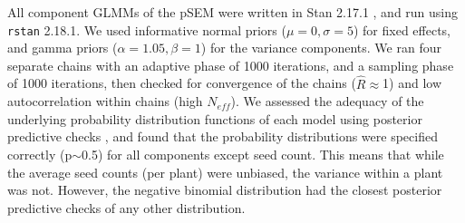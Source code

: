 \documentclass[12pt]{article} %
\begin{document}

All component GLMMs of the pSEM were written in Stan 2.17.1 \citep{gelman2015}, and run using \texttt{rstan} 2.18.1.
We used informative normal priors ($\mu=0, \sigma=5$) for fixed effects, and gamma priors ($\alpha=1.05, \beta=1$) for the variance components.
We ran four separate chains with an adaptive phase of 1000 iterations, and a sampling phase of 1000 iterations, then checked for convergence of the chains ($\hat{R} \approx$1) and low autocorrelation within chains (high $N_{eff}$).
We assessed the adequacy of the underlying probability distribution functions of each model using posterior predictive checks \citep{gelman2013}, and found that the probability distributions were specified correctly (p$\sim$0.5) for all components except seed count.
This means that while the average seed counts (per plant) were unbiased, the variance within a plant was not. 
However, the negative binomial distribution had the closest posterior predictive checks of any other distribution. 
\end{document}
